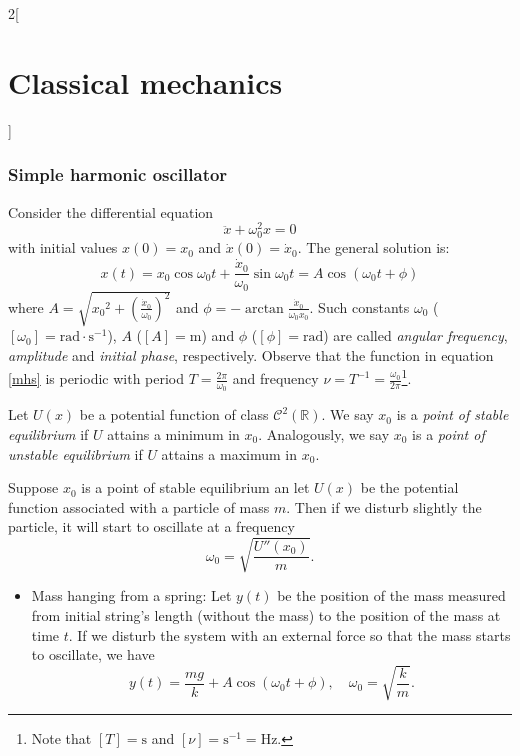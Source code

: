 \documentclass[../../../main.tex]{subfiles}
\begin{document}
\begin{multicols}{2}[\section{Classical mechanics}]
    \subsubsection*{Simple harmonic oscillator}
    \begin{prop}
        Consider the differential equation $$\ddot{x}+\omega_0^2 x=0$$ with initial values $x(0)=x_0$ and $\dot{x}(0)=\dot{x}_0$. The general solution is:
        \begin{equation}
            x(t)=x_0\cos\omega_0t+\frac{\dot{x}_0}{\omega_0}\sin\omega_0t=A\cos(\omega_0t+\phi)
            \label{mhs}
        \end{equation} where $\displaystyle A=\sqrt{{x_0}^2+{\left(\frac{\dot{x}_0}{\omega_0}\right)}^2}$ and $\displaystyle \phi=-\arctan\frac{\dot{x}_0}{\omega_0x_0}$. Such constants $\omega_0$ ($[\omega_0]=\text{rad}\cdot \text{s}^{-1}$), $A$ ($[A]=\text{m}$) and $\phi$ ($[\phi]=\text{rad}$) are called \textit{angular frequency}, \textit{amplitude} and \textit{initial phase}, respectively. Observe that the function in equation \eqref{mhs} is periodic with period $T=\frac{2\pi}{\omega_0}$ and frequency $\nu=T^{-1}=\frac{\omega_0}{2\pi}$\footnote{Note that $[T]=\text{s}$ and $[\nu]=\text{s}^{-1}=\text{Hz}$.}.
    \end{prop}
    \begin{definition}
        Let $U(x)$ be a potential function of class $\mathcal{C}^2(\mathbb{R})$. We say $x_0$ is a \textit{point of stable equilibrium} if $U$ attains a minimum in $x_0$. Analogously, we say $x_0$ is a \textit{point of unstable equilibrium} if $U$ attains a maximum in $x_0$.
    \end{definition}
    \begin{prop}
        Suppose $x_0$ is a point of stable equilibrium an let $U(x)$ be the potential function associated with a particle of mass $m$. Then if we disturb slightly the particle, it will start to oscillate at a frequency $$\omega_0=\sqrt{\frac{U''(x_0)}{m}}.$$
    \end{prop}
    \begin{prop}[Examples]
        \hfill
        \begin{itemize}
            \item Mass hanging from a spring: Let $y(t)$ be the position of the mass measured from initial string's length (without the mass) to the position of the mass at time $t$. If we disturb the system with an external force so that the mass starts to oscillate, we have $$y(t)=\frac{mg}{k}+A\cos(\omega_0t+\phi),\quad\omega_0=\sqrt{\frac{k}{m}}.$$

\end{itemize}
\end{prop}
\end{multicols}
\end{document}
